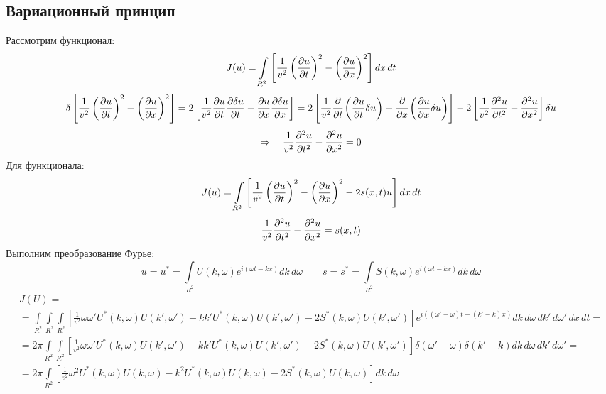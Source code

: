 \subsection{Вариационный принцип}

Рассмотрим функционал:
\[
	J(u) = \int\limits_{R^2} \left[\frac{1}{v^2} \left(\frac{\partial u}{\partial t}\right)^2 - \left(\frac{\partial u}{\partial x}\right)^2 \right] dx\, dt  
\]
\[
	\begin{gathered}
	\delta \left[\frac{1}{v^2} \left(\frac{\partial u}{\partial t}\right)^2 - \left(\frac{\partial u}{\partial x}\right)^2 \right] = 
	2 \left[\frac{1}{v^2} \frac{\partial u}{\partial t} \frac{\partial \delta u}{\partial t}  - \frac{\partial u}{\partial x} \frac{\partial \delta u}{\partial x} \right] =
	2 \left[\frac{1}{v^2} \cfrac{\partial}{\partial t} \left(\frac{\partial u}{\partial t} \delta u \right)  - \cfrac{\partial}{\partial x} \left(\frac{\partial u}{\partial x} \delta u \right) \right] -
	2 \left[\frac{1}{v^2} \frac{\partial^2 u}{\partial t^2} - \frac{\partial^2 u}{\partial x^2}\right] \delta u
	\end{gathered}
\]
\[
	\Rightarrow \quad \frac{1}{v^2} \frac{\partial^2 u}{\partial t^2} - \frac{\partial^2 u}{\partial x^2} = 0
\]
Для функционала:
\[
	J(u) = \int\limits_{R^2} \left[\frac{1}{v^2} \left(\frac{\partial u}{\partial t}\right)^2 - \left(\frac{\partial u}{\partial x}\right)^2 - 2 s(x, t) u \right] dx\, dt
\]
\[
	\frac{1}{v^2} \frac{\partial^2 u}{\partial t^2} - \frac{\partial^2 u}{\partial x^2} = s(x, t)
\]
Выполним преобразование Фурье:
\[
	u = u^* = \int\limits_{R^2} U(k, \omega) e^{i(\omega t - k x)} dk\, d\omega
	\qquad
	s = s^* = \int\limits_{R^2} S(k, \omega) e^{i(\omega t - k x)} dk\, d\omega
\]
\[
	\begin{gathered}
	J(U) = 
	\\ =
	\int\limits_{R^2} 
	\int\limits_{R^2}
	\int\limits_{R^2}
	\left[\frac{1}{v^2} \omega \omega' U^*(k, \omega) U(k', \omega') - k k' U^*(k, \omega) U(k', \omega') - 2 S^*(k, \omega) U(k', \omega') \right]
	e^{i((\omega' - \omega) t - (k' - k) x)}  dk\, d\omega\, dk'\, d\omega'\, dx\, dt
	=
	\\ =
	2\pi 
	\int\limits_{R^2} 
	\int\limits_{R^2}
	\left[\frac{1}{v^2} \omega \omega' U^*(k, \omega) U(k', \omega') - k k' U^*(k, \omega) U(k', \omega') - 2 S^*(k, \omega) U(k', \omega') \right]
	\delta(\omega' - \omega) \delta(k' - k) dk\, d\omega\, dk'\, d\omega'
	=
	\\ =
	2\pi 
	\int\limits_{R^2} 
	\left[\frac{1}{v^2} \omega^2 U^*(k, \omega) U(k, \omega) - k^2 U^*(k, \omega) U(k, \omega) - 2 S^*(k, \omega) U(k, \omega) \right]
	dk\, d\omega
	\end{gathered}
\]